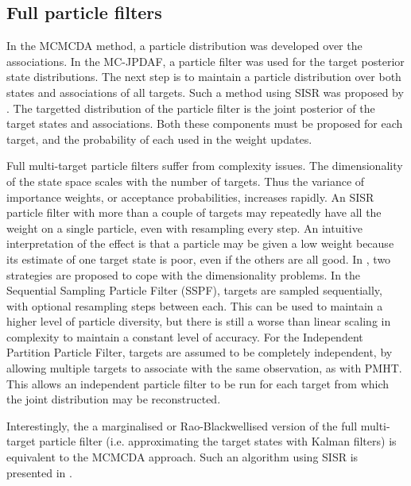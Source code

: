 \subsection{Full particle filters}
In the MCMCDA method, a particle distribution was developed over the associations. In the MC-JPDAF, a particle filter was used for the target posterior state distributions. The next step is to maintain a particle distribution over both states and associations of all targets. Such a method using SISR was proposed by \cite{Vermaak2005}. The targetted distribution of the particle filter is the joint posterior of the target states and associations. Both these components must be proposed for each target, and the probability of each used in the weight updates.

Full multi-target particle filters suffer from complexity issues. The dimensionality of the state space scales with the number of targets. Thus the variance of importance weights, or acceptance probabilities, increases rapidly. An SISR particle filter with more than a couple of targets may repeatedly have all the weight on a single particle, even with resampling every step. An intuitive interpretation of the effect is that a particle may be given a low weight because its estimate of one target state is poor, even if the others are all good. In \cite{Vermaak2005}, two strategies are proposed to cope with the dimensionality problems. In the Sequential Sampling Particle Filter (SSPF), targets are sampled sequentially, with optional resampling steps between each. This can be used to maintain a higher level of particle diversity, but there is still a worse than linear scaling in complexity to maintain a constant level of accuracy. For the Independent Partition Particle Filter, targets are assumed to be completely independent, by allowing multiple targets to associate with the same observation, as with PMHT. This allows an independent particle filter to be run for each target from which the joint distribution may be reconstructed.

Interestingly, the a marginalised or Rao-Blackwellised version of the full multi-target particle filter (i.e. approximating the target states with Kalman filters) is equivalent to the MCMCDA approach. Such an algorithm using SISR is presented in \cite{Sarkka2007}.


